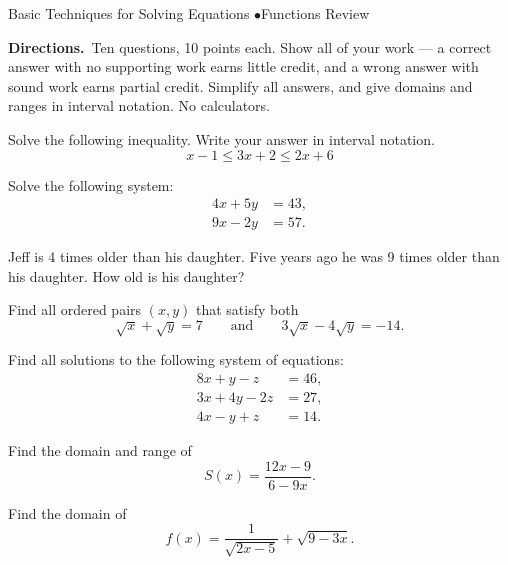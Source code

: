 \documentclass[11pt]{article}
\begin{document}
  {Basic Techniques for Solving Equations \quad$\bullet$\quad Functions Review}

\namedate

\noindent\small
\textbf{Directions.}\ Ten questions, 10 points each. Show all of your work --- a correct
answer with no supporting work earns little credit, and a wrong answer with sound work
earns partial credit. Simplify all answers, and give domains and ranges in interval
notation. No calculators.\par


\begin{questions}

\item Solve the following inequality. Write your answer in interval notation.
  \[ x - 1 \le 3x + 2 \le 2x + 6 \]
  \work

\item Solve the following system:
  \[
    \begin{aligned}
      4x + 5y &= 43,\\
      9x - 2y &= 57.
    \end{aligned}
  \]
  \work

\item Jeff is 4 times older than his daughter. Five years ago he was 9 times older than
  his daughter. How old is his daughter?
  \work

\newpage

\item Find all ordered pairs $(x,y)$ that satisfy both
  \[ \sqrt{x} + \sqrt{y} = 7 \qquad\text{and}\qquad 3\sqrt{x} - 4\sqrt{y} = -14. \]
  \work

\item Find all solutions to the following system of equations:
  \[
    \begin{aligned}
      8x + y - z &= 46,\\
      3x + 4y - 2z &= 27,\\
      4x - y + z &= 14.
    \end{aligned}
  \]
  \work

\newpage


\item Find the domain and range of
  \[ S(x) = \frac{12x-9}{6-9x}. \]
  \work

\item Find the domain of
  \[ f(x) = \frac{1}{\sqrt{2x-5}} + \sqrt{9-3x}. \]
  \work


\end{questions}
\end{document}
